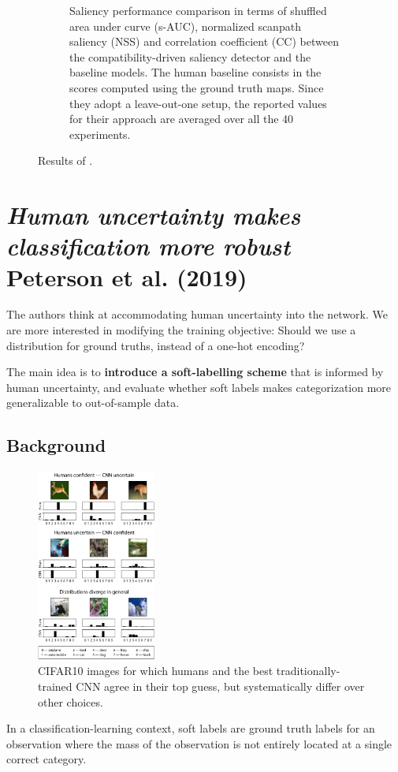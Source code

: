 \begin{figure}[!ht]
\begin{subfigure}{.49\textwidth}
        \caption{ Saliency performance comparison in terms of shuffled area under curve (s-AUC), normalized scanpath saliency (NSS) and correlation coefficient (CC) between the compatibility-driven saliency detector and the baseline models. The human baseline consists in the scores computed using the ground truth maps. Since they adopt a leave-out-one setup, the reported values for their approach are averaged over all the 40 experiments.}
        \label{fig:palazzo_4}
    \end{subfigure}
    \caption{Results of \cite{palazzo2020decoding}.}
    \label{fig:palazzo_res}
\end{figure}

\section[Accommodating human uncertainty]{\textit{Human uncertainty makes classification more robust}\\ Peterson et al. (2019)}
The authors think at accommodating human uncertainty into the network.
We are more interested in modifying the training objective: Should we use a distribution for ground truths, instead of a one-hot encoding?

The main idea is to \textbf{introduce a soft-labelling scheme} that is informed by human uncertainty, and evaluate whether soft labels makes categorization more generalizable to out-of-sample data.

\subsection{Background}

\begin{figure}
  \centering
  \includegraphics[width=0.35\textwidth]{images/peterson.png}
  \caption{CIFAR10 images for which humans and the best traditionally-trained CNN agree in their top guess, but systematically differ over other choices.}
  \label{fig:peterson}
\end{figure}
In a classification-learning context, soft labels are ground truth labels for an observation where the mass of the observation is not entirely located at a single correct category.

